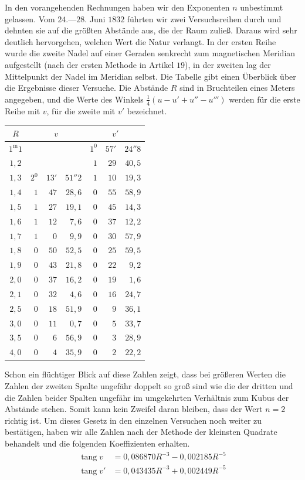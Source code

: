 In den vorangehenden Rechnungen haben wir den Exponenten $n$ unbestimmt gelassen. Vom $24$.—$28$. Juni $1832$ führten wir zwei Versuchsreihen durch und dehnten sie auf die größten Abstände aus, die der Raum zuließ. Daraus wird sehr deutlich hervorgehen, welchen Wert die Natur verlangt. In der ersten Reihe wurde die zweite Nadel auf einer Geraden senkrecht zum magnetischen Meridian aufgestellt (nach der ersten Methode in Artikel $19$), in der zweiten lag der Mittelpunkt der Nadel im Meridian selbst. Die Tabelle gibt einen Überblick über die Ergebnisse dieser Versuche. Die Abstände $R$ sind in Bruchteilen eines Meters angegeben, und die Werte des Winkels $\frac14(u-u'+u''-u''')$ werden für die erste Reihe mit $v$, für die zweite mit $v'$ bezeichnet.
\begin{center}
\begin{tabular}{c|rrr|rrr}
$R$&\multicolumn{3}{c|}{$v$}&\multicolumn{3}{c}{$v'$}\\\hline
$1^{\mathrm m}1$&&&&$1^0$&$57'$&$24''8$\\
$1{,}2$&&&&$1$&$29$&$40{,}5$\\
$1{,}3$&$2^0$&$13'$&$51''2$&$1$&$10$&$19{,}3$\\
$1{,}4$&$1$&$47$&$28{,}6$&$0$&$55$&$58{,}9$\\
$1{,}5$&$1$&$27$&$19{,}1$&$0$&$45$&$14{,}3$\\
$1{,}6$&$1$&$12$&$7{,}6$&$0$&$37$&$12{,}2$\\
$1{,}7$&$1$&$0$&$9{,}9$&$0$&$30$&$57{,}9$\\
$1{,}8$&$0$&$50$&$52{,}5$&$0$&$25$&$59{,}5$\\
$1{,}9$&$0$&$43$&$21{,}8$&$0$&$22$&$9{,}2$\\
$2{,}0$&$0$&$37$&$16{,}2$&$0$&$19$&$1{,}6$\\
$2{,}1$&$0$&$32$&$4{,}6$&$0$&$16$&$24{,}7$\\
$2{,}5$&$0$&$18$&$51{,}9$&$0$&$9$&$36{,}1$\\
$3{,}0$&$0$&$11$&$0{,}7$&$0$&$5$&$33{,}7$\\
$3{,}5$&$0$&$6$&$56{,}9$&$0$&$3$&$28{,}9$\\
$4{,}0$&$0$&$4$&$35{,}9$&$0$&$2$&$22{,}2$
\end{tabular}
\end{center}

Schon ein flüchtiger Blick auf diese Zahlen zeigt, dass bei größeren Werten die Zahlen der zweiten Spalte ungefähr doppelt so groß sind wie die der dritten und die Zahlen beider Spalten ungefähr im umgekehrten Verhältnis zum Kubus der Abstände stehen. Somit kann kein Zweifel daran bleiben, dass der Wert $n=2$ richtig ist. Um dieses Gesetz in den einzelnen Versuchen noch weiter zu bestätigen, haben wir alle Zahlen nach der Methode der kleinsten Quadrate behandelt und die folgenden Koeffizienten erhalten.
\[
\begin{aligned}
\operatorname{tang}v&=0{,}086870R^{-3}-0{,}002185R^{-5}\\
\operatorname{tang}v'&=0{,}043435R^{-3}+0{,}002449R^{-5}
\end{aligned}
\]

